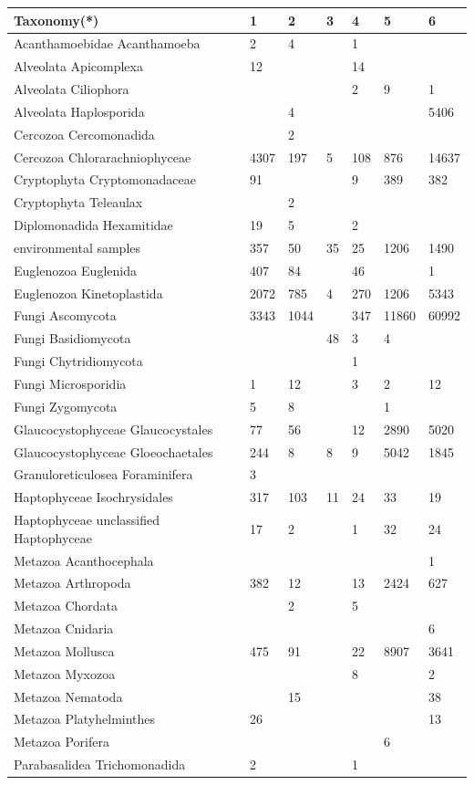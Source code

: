 \documentclass[a4paper]{article}
\begin{document}
{\small
\begin{tabular}{lllllll}
\hline
Taxonomy(*) &1&2&3&4&5&6\\
\hline
Acanthamoebidae Acanthamoeba&2&4& &1& &\\
Alveolata Apicomplexa&12&&&14& &\\
Alveolata Ciliophora&&&&2&9&1\\
Alveolata Haplosporida&&4&&&&5406\\
Cercozoa Cercomonadida&&2&&&&\\
Cercozoa Chlorarachniophyceae&4307&197&5&108&876&14637\\
Cryptophyta Cryptomonadaceae&91&&&9&389&382\\
Cryptophyta Teleaulax&&2&&&&\\
Diplomonadida Hexamitidae&19&5&&2&&\\
environmental samples&357&50&35&25&1206&1490\\
Euglenozoa Euglenida&407&84&&46&&1\\
Euglenozoa Kinetoplastida&2072&785&4&270&1206&5343\\
Fungi Ascomycota&3343&1044&&347&11860&60992\\
Fungi Basidiomycota&&&48&3&4&\\
Fungi Chytridiomycota&&&&1&&\\
Fungi Microsporidia&1&12&&3&2&12\\
Fungi Zygomycota&5&8&&&1&\\
Glaucocystophyceae Glaucocystales&77&56&&12&2890&5020\\
Glaucocystophyceae Gloeochaetales&244&8&8&9&5042&1845\\
Granuloreticulosea Foraminifera&3&&&&&\\
Haptophyceae Isochrysidales&317&103&11&24&33&19\\
Haptophyceae unclassified Haptophyceae&17&2&&1&32&24\\
Metazoa Acanthocephala&&&&&&1\\
Metazoa Arthropoda&382&12&&13&2424&627\\
Metazoa Chordata&&2&&5&&\\
Metazoa Cnidaria&&&&&&6\\
Metazoa Mollusca&475&91&&22&8907&3641\\
Metazoa Myxozoa&&&&8&&2\\
Metazoa Nematoda&&15&&&&38\\
Metazoa Platyhelminthes&26&&&&&13\\
Metazoa Porifera&&&&&6&\\
Parabasalidea Trichomonadida&2&&&1&&\\

\end{tabular}}
\end{document}
